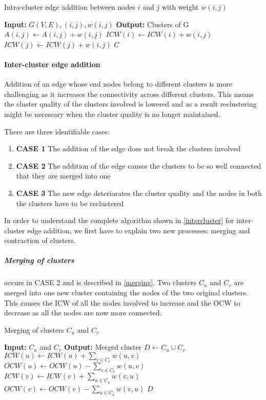 \begin{algorithm}
\caption{Intra-cluster edge addition between nodes $i$ and $j$ with weight $w(i,j)$}
\label{intracluster}
\begin{algorithmic}
\STATE \textbf{Input:} $G(V,E), (i,j), w(i,j)$ 
\STATE \textbf{Output:} Clusters of G
\STATE $A(i,j) \leftarrow A(i,j) + w(i,j)$
\STATE $ICW(i) \leftarrow ICW(i) + w(i,j)$
\STATE $ICW(j) \leftarrow ICW(j) + w(i,j)$
\RETURN $C$
\end{algorithmic}
\end{algorithm}

\paragraph{Inter-cluster edge addition}

Addition of an edge whose end nodes belong to different clusters is more challenging as it increases the connectivity across different clusters. This means the cluster quality of the clusters involved is lowered and as a result reclustering might be necessary when the cluster quality is no longer maintained. 

There are three identifiable cases:

\begin{enumerate}
	\item \textbf{CASE 1} The addition of the edge does not break the clusters involved
	\item \textbf{CASE 2} The addition of the edge causes the clusters to be so well connected that they are merged into one
	\item \textbf{CASE 3} The new edge deteriorates the cluster quality and the nodes in both the clusters have to be reclustered
\end{enumerate}

In order to understand the complete algorithm shown in \ref{intercluster} for inter-cluster edge addition, we first have to explain two new processes: merging and contraction of clusters.

\subparagraph{Merging of clusters} occurs in CASE 2 and is described in \ref{merging}. Two clusters $C_u$ and $C_v$ are merged into one new cluster containing the nodes of the two original clusters. This causes the ICW of all the nodes involved to increase and the OCW to decrease as all the nodes are now more connected.

\begin{algorithm}
\caption{Merging of clusters $C_u$ and $C_v$}
\label{merging}
\begin{algorithmic}
\STATE \textbf{Input:} $C_u$ and $C_v$ 
\STATE \textbf{Output:} Merged cluster
\STATE $D \leftarrow C_u \cup C_v$
	\STATE $ICW(u) \leftarrow ICW(u) + \sum_{v \in C_v}{w(u,v)}$
	\STATE $OCW(u) \leftarrow OCW(u) - \sum_{v \in C_v}{w(u,v)}$
\ENDFOR
{}
	\STATE $ICW(v) \leftarrow ICW(v) + \sum_{u \in C_u}{w(v,u)}$
	\STATE $OCW(v) \leftarrow OCW(v) - \sum_{u \in C_u}{w(v,u)}$
\ENDFOR
\RETURN $D$
\end{algorithmic}
\end{algorithm}

